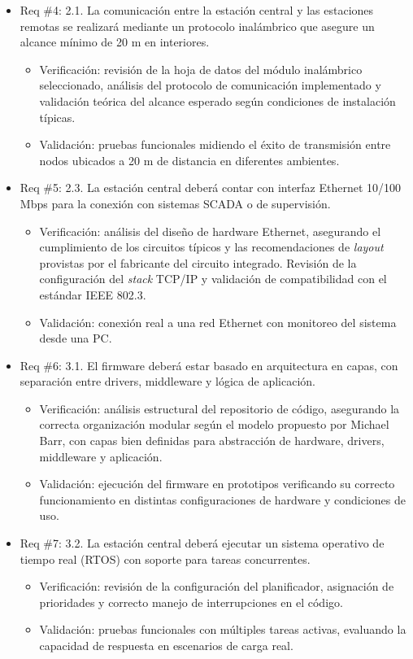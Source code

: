 \documentclass[
11pt, %
]{charter}
\begin{document}
\begin{itemize}
	\item Req \#4: 2.1. La comunicación entre la estación central y las estaciones remotas se realizará mediante un protocolo inalámbrico que asegure un alcance mínimo de 20 m en interiores.
	\begin{itemize}
		\item Verificación: revisión de la hoja de datos del módulo inalámbrico seleccionado, análisis del protocolo de comunicación implementado y validación teórica del alcance esperado según condiciones de instalación típicas.
		\item Validación: pruebas funcionales midiendo el éxito de transmisión entre nodos ubicados a 20 m de distancia en diferentes ambientes.
	\end{itemize}
	
	\item Req \#5: 2.3. La estación central deberá contar con interfaz Ethernet 10/100 Mbps para la conexión con sistemas SCADA o de supervisión.
	\begin{itemize}
		\item Verificación: análisis del diseño de hardware Ethernet, asegurando el cumplimiento de los circuitos típicos y las recomendaciones de \textit{layout} provistas por el fabricante del circuito integrado. Revisión de la configuración del \textit{stack} TCP/IP y validación de compatibilidad con el estándar IEEE 802.3.
		\item Validación: conexión real a una red Ethernet con monitoreo del sistema desde una PC.
	\end{itemize}
	
	\newpage
	\item Req \#6: 3.1. El firmware deberá estar basado en arquitectura en capas, con separación entre drivers, middleware y lógica de aplicación.
	\begin{itemize}
		\item Verificación: análisis estructural del repositorio de código, asegurando la correcta organización modular según el modelo propuesto por Michael Barr, con capas bien definidas para abstracción de hardware, drivers, middleware y aplicación.
		\item Validación: ejecución del firmware en prototipos verificando su correcto funcionamiento en distintas configuraciones de hardware y condiciones de uso.
	\end{itemize}
	
	\item Req \#7: 3.2. La estación central deberá ejecutar un sistema operativo de tiempo real (RTOS) con soporte para tareas concurrentes.
	\begin{itemize}
		\item Verificación: revisión de la configuración del planificador, asignación de prioridades y correcto manejo de interrupciones en el código.
		\item Validación: pruebas funcionales con múltiples tareas activas, evaluando la capacidad de respuesta en escenarios de carga real.
	\end{itemize}
	

\end{itemize}
\end{document}
